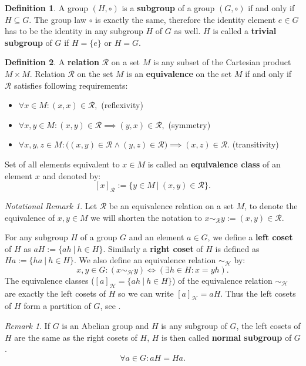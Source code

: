 \documentclass[thesis=M,english]{FITthesis}[2012/10/20]
\theoremstyle{remark}
\newtheorem*{RM}{Remark}
\newtheorem*{NRM}{Notational Remark}
\theoremstyle{definition}
\newtheorem{DF}{Definition}[section]
\begin{document}
\begin{DF}
A group $(H, \circ)$ is a \textbf{subgroup} of a group $(G, \circ)$ if and only if $H \subseteq G.$ The group law $\circ$ is exactly the same, therefore the identity element $e \in G$ has to be the identity in any subgroup $H$ of $G$ as well. $H$ is called a \textbf{trivial subgroup} of $G$ if $H = \{e\}$ or $H = G$.
\end{DF}
\begin{DF}
A \textbf{relation} $\mathcal{R}$ on a set $M$ is any subset of the Cartesian product $M\times M$. Relation $\mathcal{R}$ on the set $M$ is an \textbf{equivalence} on the set $M$ if and only if $\mathcal{R}$ satisfies following requirements:
\begin{itemize}
\item $\forall	x \in M: (x,x) \in \mathcal{R},$ \hfill (reflexivity)
\item $\forall x,y \in M: (x,y) \in \mathcal{R} \implies (y,x) \in \mathcal{R},$ \hfill (symmetry)
\item $\forall x,y,z \in M: \bigg( (x,y) \in \mathcal{R} \land (y,z) \in \mathcal{R}\bigg) \implies (x,z) \in \mathcal{R}.$ \hfill (transitivity)
\end{itemize}
\end{DF}
\noindent Set of all elements equivalent to $x \in M$ is called an \textbf{equivalence class} of an element $x$ and denoted by:
$$
[x]_\mathcal{R} := \{y \in M \ |\ (x,y) \in \mathcal{R}\}.
$$
\begin{NRM}
Let $\mathcal{R}$ be an equivalence relation on a set $M$, to denote the equivalence of $x,y \in M$ we will shorten the notation to $x \sim_\mathcal{R} y := (x,y) \in \mathcal{R}.$ 
\end{NRM}
\noindent For any subgroup $H$ of a group $G$ and an element $a \in G$, we define a \textbf{left coset} of $H$ as $aH := \{ah\ |\ h \in H\}$. Similarly a \textbf{right coset} of $H$ is defined as $Ha := \{ha\ |\ h \in H\}$.  We also define an equivalence relation $\sim_{\mathcal{H}}$ by: 
$$
x,y \in G: (x \sim_{\mathcal{H}} y) \Leftrightarrow (\exists h \in H: x = yh).
$$
The equivalence classes ($[a]_{\mathcal{H}} = \{ah\ |\ h \in H \}$) of the equivalence relation $\sim_{\mathcal{H}}$ are exactly the left cosets of $H$ so we can write $[a]_{\mathcal{H}} = aH$. Thus the left cosets of $H$ form a partition of $G$, see \cite{coset}.
\begin{RM}
If $G$ is an Abelian group and $H$ is any subgroup of $G$, the left cosets of $H$ are the same as the right cosets of $H$, $H$ is then called \textbf{normal subgroup} of $G$. 
$$
\forall a \in G: aH = Ha.
$$ 
\end{RM} 
\end{document}
